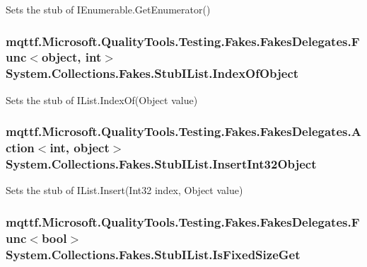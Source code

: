 Sets the stub of I\-Enumerable.\-Get\-Enumerator()

\hypertarget{class_system_1_1_collections_1_1_fakes_1_1_stub_i_list_ac1a926a9db231775aef51bd452ee646e}{
\subsubsection[{Index\-Of\-Object}]{\setlength{\rightskip}{0pt plus 5cm}mqttf.\-Microsoft.\-Quality\-Tools.\-Testing.\-Fakes.\-Fakes\-Delegates.\-Func$<$object, int$>$ System.\-Collections.\-Fakes.\-Stub\-I\-List.\-Index\-Of\-Object}}\label{class_system_1_1_collections_1_1_fakes_1_1_stub_i_list_ac1a926a9db231775aef51bd452ee646e}


Sets the stub of I\-List.\-Index\-Of(\-Object value)

\hypertarget{class_system_1_1_collections_1_1_fakes_1_1_stub_i_list_a4fb41a174f77b4717d17bc21e32163e2}{
\subsubsection[{Insert\-Int32\-Object}]{\setlength{\rightskip}{0pt plus 5cm}mqttf.\-Microsoft.\-Quality\-Tools.\-Testing.\-Fakes.\-Fakes\-Delegates.\-Action$<$int, object$>$ System.\-Collections.\-Fakes.\-Stub\-I\-List.\-Insert\-Int32\-Object}}\label{class_system_1_1_collections_1_1_fakes_1_1_stub_i_list_a4fb41a174f77b4717d17bc21e32163e2}


Sets the stub of I\-List.\-Insert(\-Int32 index, Object value)

\hypertarget{class_system_1_1_collections_1_1_fakes_1_1_stub_i_list_a3741d360b135130e9cd325932a7050db}{
\subsubsection[{Is\-Fixed\-Size\-Get}]{\setlength{\rightskip}{0pt plus 5cm}mqttf.\-Microsoft.\-Quality\-Tools.\-Testing.\-Fakes.\-Fakes\-Delegates.\-Func$<$bool$>$ System.\-Collections.\-Fakes.\-Stub\-I\-List.\-Is\-Fixed\-Size\-Get}}\label{class_system_1_1_collections_1_1_fakes_1_1_stub_i_list_a3741d360b135130e9cd325932a7050db}



